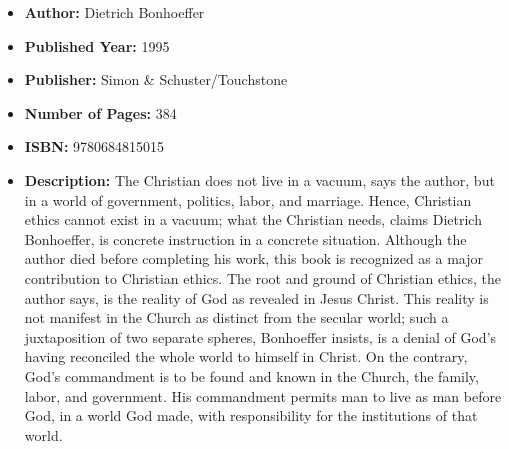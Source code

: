 \documentclass{tufte-handout}
\begin{document}
\begin{itemize}
    \item[] \textbf{Author:} Dietrich Bonhoeffer
    \item[] \textbf{Published Year:} 1995  
    \item[] \textbf{Publisher:} Simon \& Schuster/Touchstone
    \item[] \textbf{Number of Pages:} 384      
    \item[] \textbf{ISBN:} 9780684815015
    \item[] \textbf{Description:} The Christian does not live in a vacuum, says the author, but in a world of government, politics, labor, and marriage. Hence, Christian ethics cannot exist in a vacuum; what the Christian needs, claims Dietrich Bonhoeffer, is concrete instruction in a concrete situation. Although the author died before completing his work, this book is recognized as a major contribution to Christian ethics. The root and ground of Christian ethics, the author says, is the reality of God as revealed in Jesus Christ. This reality is not manifest in the Church as distinct from the secular world; such a juxtaposition of two separate spheres, Bonhoeffer insists, is a denial of God’s having reconciled the whole world to himself in Christ. On the contrary, God’s commandment is to be found and known in the Church, the family, labor, and government. His commandment permits man to live as man before God, in a world God made, with responsibility for the institutions of that world.
\end{itemize}
\end{document}
